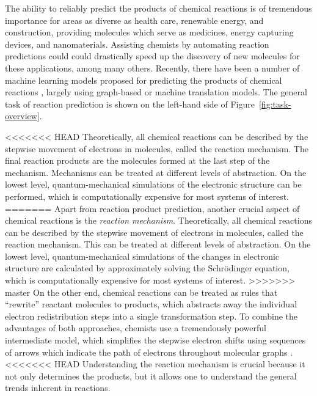 
The ability to reliably predict the products of chemical reactions is of tremendous importance for areas as diverse as health care, renewable energy, and construction, providing molecules which serve as medicines, energy capturing devices, and nanomaterials. 
Assisting chemists by automating reaction predictions could could drastically speed up the discovery of new molecules for these applications, among many others. Recently, there have been a number of machine learning models proposed for predicting the products of chemical reactions \cite{coley2017prediction,jin2017predicting,schwaller2017found,neural-symbolic,segler2018planning,wei2016neural}, largely using graph-based or machine translation models. The general task of reaction prediction is shown on the left-hand side of Figure~\ref{fig:task-overview}.

<<<<<<< HEAD
Theoretically, all chemical reactions can be described by the stepwise movement of electrons in molecules, called the reaction mechanism. The final reaction products are the molecules formed at the last step of the mechanism. 
Mechanisms can be treated at different levels of abstraction. On the lowest level, quantum-mechanical simulations of the electronic structure can be performed, which is computationally expensive for most systems of interest. 
=======
Apart from reaction product prediction, another crucial aspect of chemical reactions is the \emph{reaction mechanism}. Theoretically, all chemical reactions can be described by the stepwise movement of electrons in molecules, called the reaction mechanism.
This can be treated at different levels of abstraction. On the lowest level, quantum-mechanical simulations of the  changes in electronic structure are calculated by approximately solving the Schr\"odinger equation, which is computationally expensive for most systems of interest. 
>>>>>>> master
On the other end, chemical reactions can be treated as rules that ``rewrite'' reactant molecules to products, which abstracts away the individual electron redistribution steps into a single transformation step. 
To combine the advantages of both approaches, chemists use a tremendously powerful intermediate model, which simplifies the stepwise electron shifts using sequences of arrows which indicate the path of electrons throughout molecular graphs \cite{herges1994organizing}. 
<<<<<<< HEAD
Understanding the reaction mechanism is crucial because it not only determines the products, but it allows one to understand the general trends inherent in reactions. %



